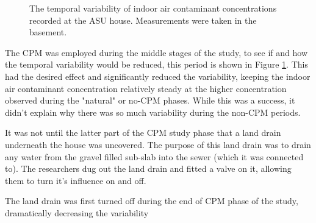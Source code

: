 \begin{figure}[htb!] %
  \caption{The temporal variability of indoor air contaminant concentrations recorded at the ASU house. Measurements were taken in the basement. }
  \label{fig:asu_indoor_concentrations}
\end{figure}

The CPM was employed during the middle stages of the study, to see if and how the temporal variability would be reduced, this period is shown in Figure \ref{fig:asu_indoor_concentrations}.
This had the desired effect and significantly reduced the variability, keeping the indoor air contaminant concentration relatively steady at the higher concentration observed during the "natural" or no-CPM phases.
While this was a success, it didn't explain why there was so much variability during the non-CPM periods.\par

It was not until the latter part of the CPM study phase that a land drain underneath the house was uncovered.
The purpose of this land drain was to drain any water from the gravel filled sub-slab into the sewer (which it was connected to).
The researchers dug out the land drain and fitted a valve on it, allowing them to turn it's influence on and off.\par

The land drain was first turned off during the end of CPM phase of the study, dramatically decreasing the variability




\begin{figure}
  \caption{}
  \label{}
\end{figure}
